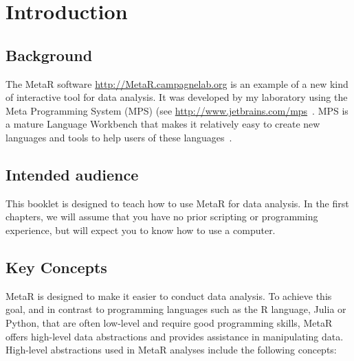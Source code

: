 


\chapter{Introduction}\label{chap:Introduction}
\section{Background}
The MetaR software \url{http://MetaR.campagnelab.org} is an example of a new kind of interactive tool for data analysis. It was developed by my laboratory using the Meta Programming System (MPS) (see \url{http://www.jetbrains.com/mps}~\cite{Dmitriev:2004}. MPS is a mature Language Workbench that makes it relatively easy to create new languages and tools to help users of these languages~\cite{campagne2014mps}. 

\section{Intended audience}
This booklet is designed to teach how to use MetaR for data analysis. In the first chapters, we will assume that you have no prior scripting or programming experience, but will expect you to know how to use a computer.


\section{Key Concepts}
MetaR is designed to make it easier to conduct data analysis. To achieve this goal, and in contrast to programming languages such as the R language, Julia or Python, that are often low-level and require good programming skills, MetaR offers high-level data abstractions and provides assistance in manipulating data. High-level abstractions used in MetaR analyses include the following concepts:

